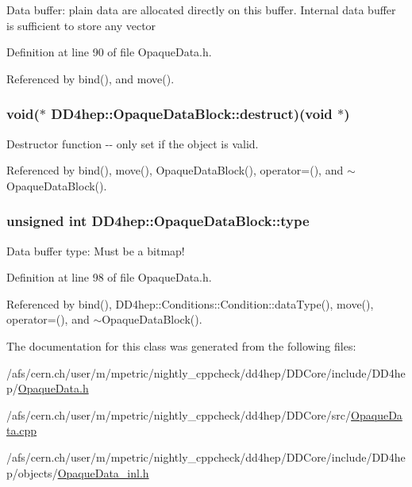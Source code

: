 Data buffer: plain data are allocated directly on this buffer. Internal data buffer is sufficient to store any vector 

Definition at line 90 of file OpaqueData.h.

Referenced by bind(), and move().\hypertarget{class_d_d4hep_1_1_opaque_data_block_a6958d0e712c3e0126bc61b84d1f16ed2}{
\subsubsection[{destruct}]{\setlength{\rightskip}{0pt plus 5cm}void($\ast$ {\bf DD4hep::OpaqueDataBlock::destruct})(void $\ast$)}}
\label{class_d_d4hep_1_1_opaque_data_block_a6958d0e712c3e0126bc61b84d1f16ed2}


Destructor function -\/-\/ only set if the object is valid. 

Referenced by bind(), move(), OpaqueDataBlock(), operator=(), and $\sim$OpaqueDataBlock().\hypertarget{class_d_d4hep_1_1_opaque_data_block_a6e7306f78bcdfcf15f53fdc6a2f34457}{
\subsubsection[{type}]{\setlength{\rightskip}{0pt plus 5cm}unsigned int {\bf DD4hep::OpaqueDataBlock::type}}}
\label{class_d_d4hep_1_1_opaque_data_block_a6e7306f78bcdfcf15f53fdc6a2f34457}


Data buffer type: Must be a bitmap! 

Definition at line 98 of file OpaqueData.h.

Referenced by bind(), DD4hep::Conditions::Condition::dataType(), move(), operator=(), and $\sim$OpaqueDataBlock().

The documentation for this class was generated from the following files:\begin{DoxyCompactItemize}
\item 
/afs/cern.ch/user/m/mpetric/nightly\_\-cppcheck/dd4hep/DDCore/include/DD4hep/\hyperlink{_opaque_data_8h}{OpaqueData.h}\item 
/afs/cern.ch/user/m/mpetric/nightly\_\-cppcheck/dd4hep/DDCore/src/\hyperlink{_opaque_data_8cpp}{OpaqueData.cpp}\item 
/afs/cern.ch/user/m/mpetric/nightly\_\-cppcheck/dd4hep/DDCore/include/DD4hep/objects/\hyperlink{_opaque_data__inl_8h}{OpaqueData\_\-inl.h}\end{DoxyCompactItemize}
